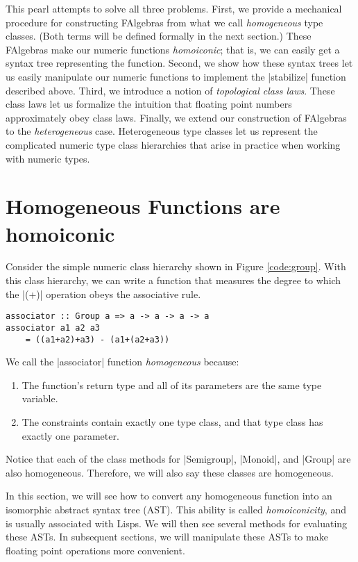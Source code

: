 \documentclass[preprint]{sigplanconf}
\theoremstyle{definition}
\begin{document}
This pearl attempts to solve all three problems.
First, we provide a mechanical procedure for constructing FAlgebras from what we call \emph{homogeneous} type classes.
(Both terms will be defined formally in the next section.)
These FAlgebras make our numeric functions \emph{homoiconic};
that is, we can easily get a syntax tree representing the function.
Second, we show how these syntax trees let us easily manipulate our numeric functions to implement the |stabilize| function described above.
Third, we introduce a notion of \emph{topological class laws}.
These class laws let us formalize the intuition that floating point numbers approximately obey class laws.
Finally, we extend our construction of FAlgebras to the \emph{heterogeneous} case.
Heterogeneous type classes let us represent the complicated numeric type class hierarchies that arise in practice when working with numeric types.

\section{Homogeneous Functions are homoiconic}
Consider the simple numeric class hierarchy shown in Figure \ref{code:group}.
With this class hierarchy, we can write a function that measures the degree to which the |(+)| operation obeys the associative rule.
\begin{lstlisting}
associator :: Group a => a -> a -> a -> a
associator a1 a2 a3
    = ((a1+a2)+a3) - (a1+(a2+a3))
\end{lstlisting}
We call the |associator| function \emph{homogeneous} because:
\begin{enumerate}
\item
The function's return type and all of its parameters are the same type variable.
\item
The constraints contain exactly one type class, and
that type class has exactly one parameter.
\end{enumerate}
Notice that each of the class methods for |Semigroup|, |Monoid|, and |Group| are also homogeneous.
Therefore, we will also say these classes are homogeneous.

In this section, we will see how to convert any homogeneous function into an isomorphic abstract syntax tree (AST).
This ability is called \emph{homoiconicity},
and is usually associated with Lisps.
We will then see several methods for evaluating these ASTs.
In subsequent sections, we will manipulate these ASTs to make floating point operations more convenient.
\end{document}
